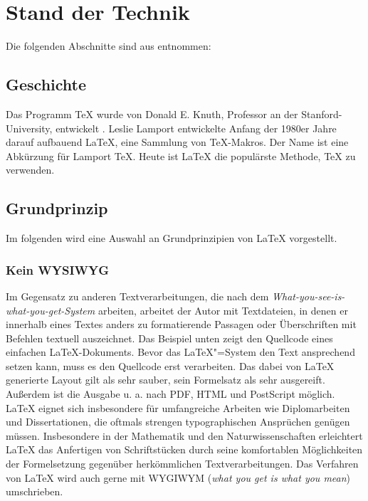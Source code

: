 \chapter{Stand der Technik} 
Die folgenden Abschnitte sind aus \cite{wikipedia-latex} entnommen:

\section{Geschichte}

Das Programm \TeX{} wurde von Donald E. Knuth, Professor an der
Stanford-University, entwickelt \cite{Knuth84}. Leslie Lamport entwickelte
Anfang der 1980er Jahre \cite{Lamport94} darauf aufbauend \LaTeX{}, eine
Sammlung von \TeX{}-Makros. Der Name ist eine Abkürzung für Lamport \TeX{}.
Heute ist \LaTeX{} die populärste Methode, \TeX{} zu verwenden.

\section{Grundprinzip}

Im folgenden wird eine Auswahl an Grundprinzipien von \LaTeX{} vorgestellt.

\subsection{Kein WYSIWYG}

Im Gegensatz zu anderen Textverarbeitungen, die nach dem
\emph{What-you-see-is-what-you-get-System} arbeiten, arbeitet der Autor mit
Textdateien, in denen er innerhalb eines Textes anders zu formatierende
Passagen oder Überschriften mit Befehlen textuell auszeichnet. Das Beispiel
unten zeigt den Quellcode eines einfachen \LaTeX{}-Dokuments. Bevor das
\LaTeX{}"=System den Text ansprechend setzen kann, muss es den Quellcode erst
verarbeiten. Das dabei von \LaTeX{} generierte Layout gilt als sehr sauber,
sein Formelsatz als sehr ausgereift. Außerdem ist die Ausgabe u. a. nach PDF,
HTML und PostScript möglich. \LaTeX{} eignet sich insbesondere für umfangreiche
Arbeiten wie Diplomarbeiten und Dissertationen, die oftmals strengen
typographischen Ansprüchen genügen müssen. Insbesondere in der Mathematik und
den Naturwissenschaften erleichtert \LaTeX{} das Anfertigen von Schriftstücken
durch seine komfortablen Möglichkeiten der Formelsetzung gegenüber
herkömmlichen Textverarbeitungen. Das Verfahren von \LaTeX{} wird auch gerne
mit WYGIWYM (\emph{what you get is what you mean}) umschrieben.

